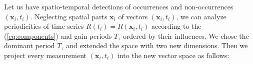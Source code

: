 %

Let us have spatio-temporal detections of occurrences and non-occurrences $\left(\mathbf{x}_i, t_i\right)$.
Neglecting spatial parts $\mathbf{x}_{i}$ of vectors $\left(\mathbf{x}_i, t_i\right)$, we can analyze periodicities of time series $R\left(t_{i}\right) = R\left(\mathbf{x}_i, t_i\right)$ according to the (\ref{eq:components}) and gain periods $T_{\tau}$ ordered by their influences.
We chose the dominant period $T_{\tau}$ and extended the space with two new dimensions.
Then we project every measurement $\left(\mathbf{x}_i, t_i\right)$ into the new vector space as follows:

